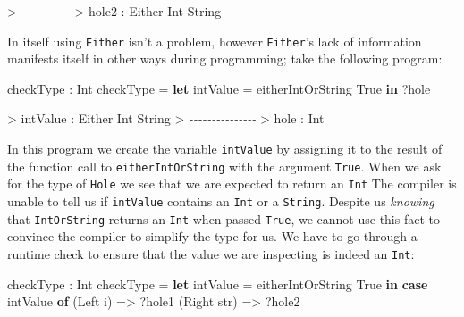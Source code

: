 \documentclass[
]{article}
\newenvironment{Shaded}{}{}
\newcommand{\CommentTok}[1]{\textcolor[rgb]{0.38,0.63,0.69}{\textit{#1}}}
\newcommand{\DataTypeTok}[1]{\textcolor[rgb]{0.56,0.13,0.00}{#1}}
\newcommand{\KeywordTok}[1]{\textcolor[rgb]{0.00,0.44,0.13}{\textbf{#1}}}
\newcommand{\NormalTok}[1]{#1}
\newcommand{\OperatorTok}[1]{\textcolor[rgb]{0.40,0.40,0.40}{#1}}
\newcommand{\OtherTok}[1]{\textcolor[rgb]{0.00,0.44,0.13}{#1}}
\begin{document}
\begin{Shaded}
\begin{Highlighting}[]
\OperatorTok{\textgreater{}} \CommentTok{{-}{-}{-}{-}{-}{-}{-}{-}{-}{-}{-}}
\OperatorTok{\textgreater{}}\NormalTok{ hole2 }\OperatorTok{:} \DataTypeTok{Either} \DataTypeTok{Int} \DataTypeTok{String}
\end{Highlighting}
\end{Shaded}

In itself using \texttt{Either} isn't a problem, however
\texttt{Either}'s lack of information manifests itself in other ways
during programming; take the following program:

\begin{Shaded}
\begin{Highlighting}[]
\NormalTok{checkType }\OperatorTok{:} \DataTypeTok{Int}
\NormalTok{checkType }\OtherTok{=} \KeywordTok{let}\NormalTok{ intValue }\OtherTok{=}\NormalTok{ eitherIntOrString }\DataTypeTok{True} 
             \KeywordTok{in} \OperatorTok{?}\NormalTok{hole}
\end{Highlighting}
\end{Shaded}

\begin{Shaded}
\begin{Highlighting}[]
\OperatorTok{\textgreater{}}\NormalTok{ intValue }\OperatorTok{:} \DataTypeTok{Either} \DataTypeTok{Int} \DataTypeTok{String}
\OperatorTok{\textgreater{}} \CommentTok{{-}{-}{-}{-}{-}{-}{-}{-}{-}{-}{-}{-}{-}{-}{-}}
\OperatorTok{\textgreater{}}\NormalTok{ hole }\OperatorTok{:} \DataTypeTok{Int}
\end{Highlighting}
\end{Shaded}

In this program we create the variable \texttt{intValue} by assigning it
to the result of the function call to \texttt{eitherIntOrString} with
the argument \texttt{True}. When we ask for the type of \texttt{Hole} we
see that we are expected to return an \texttt{Int} The compiler is
unable to tell us if \texttt{intValue} contains an \texttt{Int} or a
\texttt{String}. Despite us \emph{knowing} that \texttt{IntOrString}
returns an \texttt{Int} when passed \texttt{True}, we cannot use this
fact to convince the compiler to simplify the type for us. We have to go
through a runtime check to ensure that the value we are inspecting is
indeed an \texttt{Int}:

\begin{Shaded}
\begin{Highlighting}[]
\NormalTok{checkType }\OperatorTok{:} \DataTypeTok{Int}
\NormalTok{checkType }\OtherTok{=} \KeywordTok{let}\NormalTok{ intValue }\OtherTok{=}\NormalTok{ eitherIntOrString }\DataTypeTok{True} \KeywordTok{in}
                \KeywordTok{case}\NormalTok{ intValue }\KeywordTok{of}
\NormalTok{                     (}\DataTypeTok{Left}\NormalTok{ i) }\OtherTok{=\textgreater{}} \OperatorTok{?}\NormalTok{hole1}
\NormalTok{                     (}\DataTypeTok{Right}\NormalTok{ str) }\OtherTok{=\textgreater{}} \OperatorTok{?}\NormalTok{hole2}
\end{Highlighting}
\end{Shaded}
\end{document}
